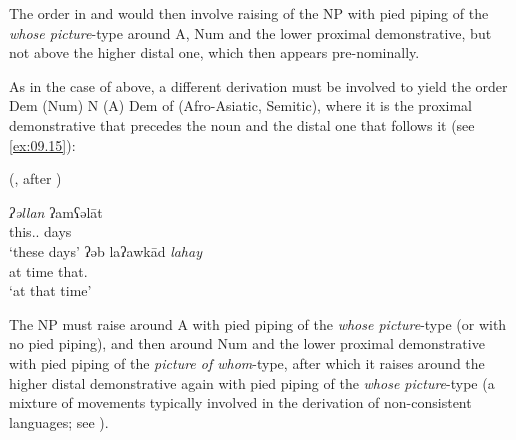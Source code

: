 \documentclass[output=paper]{langsci/langscibook}
\begin{document}
\ea\label{ex:09.14}
\z

The order in  and  would then involve raising of the NP
with pied piping of the \emph{whose picture}-type around A, Num and the lower
proximal demonstrative, but not above the higher distal one, which then appears
pre-nominally.

As in the case of  above, a different derivation must be involved
to yield the order Dem (Num) N (A) Dem of 
(Afro-Asiatic, Semitic), where it is the proximal demonstrative that precedes
the noun and the distal one that follows it (see \ref{ex:09.15}):

\ea {} (\citealt{Dryer2013}, after \citealt[45]{Raz1983})\label{ex:09.15}
    \begin{multicols}{2}
	\ea
		\gll \textit{ʔəllan}  ʔamʕəl\=at\\
			{this.\glossF.\Pl{}} days\\
		\glt ‘these days’
	\ex
		\gll ʔəb laʔawk\=ad  \textit{lahay}\\
            at time {that.\M{}}\\
		\glt ‘at that time’
	\z
	\end{multicols}
\z

The NP must raise around A with pied piping of the \emph{whose
picture}-type (or with no pied piping), and then around Num and the lower
proximal demonstrative with pied piping of the \emph{picture of
whom}-type, after which it raises around the higher distal demonstrative again
with pied piping of the \emph{whose picture}-type (a mixture of
movements typically involved in the derivation of non-consistent languages; see
\citealt{Cinque2017}).
\end{document}
